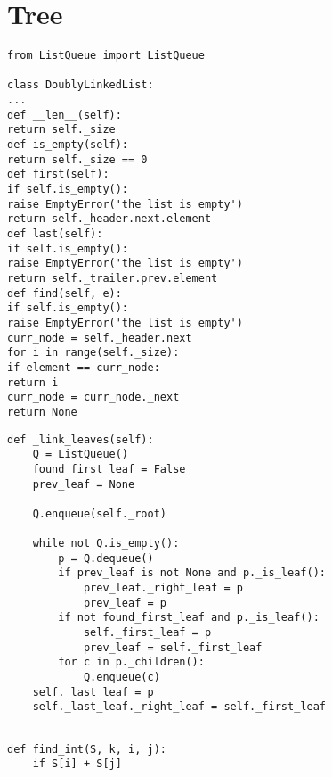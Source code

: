 \documentclass[10pt]{article}
\begin{document}
\section{Tree}

\begin{verbatim}
from ListQueue import ListQueue

class DoublyLinkedList:
...
def __len__(self):
return self._size
def is_empty(self):
return self._size == 0
def first(self):
if self.is_empty():
raise EmptyError('the list is empty')
return self._header.next.element
def last(self):
if self.is_empty():
raise EmptyError('the list is empty')
return self._trailer.prev.element
def find(self, e):
if self.is_empty():
raise EmptyError('the list is empty')
curr_node = self._header.next
for i in range(self._size):
if element == curr_node:
return i
curr_node = curr_node._next
return None
\end{verbatim}

\begin{verbatim}
def _link_leaves(self):
    Q = ListQueue()
    found_first_leaf = False
    prev_leaf = None
    
    Q.enqueue(self._root)
    
    while not Q.is_empty():
        p = Q.dequeue()
        if prev_leaf is not None and p._is_leaf():
            prev_leaf._right_leaf = p
            prev_leaf = p
        if not found_first_leaf and p._is_leaf():
            self._first_leaf = p
            prev_leaf = self._first_leaf
        for c in p._children():
            Q.enqueue(c)
    self._last_leaf = p
    self._last_leaf._right_leaf = self._first_leaf
    
\end{verbatim}

\begin{verbatim}
def find_int(S, k, i, j):
    if S[i] + S[j] 
\end{verbatim}

\begin{verbatim}

\end{verbatim}
\end{document}

